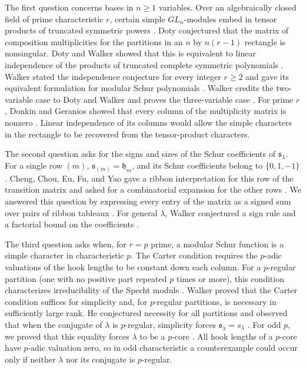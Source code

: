 \documentclass[12pt,reqno,a4paper]{amsart}
\numberwithin{equation}{section}
\numberwithin{figure}{section}
\theoremstyle{plain}
\theoremstyle{definition}
\begin{document}
The first question concerns bases in $n\geq1$ variables.  Over an
algebraically closed field of prime characteristic $r$, certain
simple $GL_n$-modules embed in tensor products of truncated symmetric
powers \cite[Section~1]{DotyWalkerTruncated}.  Doty conjectured that the
matrix of composition multiplicities for the partitions in an
$n$ by $n(r-1)$ rectangle is nonsingular.  Doty and Walker showed that
this is equivalent to linear independence of the products of truncated
complete symmetric polynomials \cite[Conjecture~2.6 and Proposition~3.1]{DotyWalker}.
Walker stated the independence conjecture for every integer $r\geq2$
and gave its equivalent formulation for modular Schur polynomials
\cite[Conjecture~1.4 and Proposition~1.5(i)]{Walker}.
Walker credits the two-variable case to Doty and Walker and proves
the three-variable case
\cite[p.~576 and Proposition~2.17]{Walker}.
For prime $r$, Donkin and Geranios showed that every column of the
multiplicity matrix is nonzero \cite[Corollary~6.8, p.~432]{DonkinGeranios}.
Linear independence of its columns would allow the simple characters
in the rectangle to be recovered from the tensor-product characters.

The second question asks for the signs and sizes of the Schur
coefficients of $\mathfrak s_\lambda$.  For a single row $(m)$,
$\mathfrak s_{(m)}=\mathfrak h_m$, and its Schur coefficients belong
to $\{0,1,-1\}$ \cite{FuMei,Grinberg}.  Cheng, Chou, Eu, Fu, and Yao
gave a ribbon interpretation for this row of the transition matrix
and asked for a combinatorial expansion for the other rows
\cite[Theorem~1.3 and Section~4]{ChengEtAl}.  We answered this
question by expressing every entry of the matrix as a signed sum over
pairs of ribbon tableaux \cite[Theorem~8.8]{JingLiuSkewMN}.
For general $\lambda$,
Walker conjectured a sign rule and a factorial bound on the
coefficients \cite[unnumbered conjecture following Corollary~2.10, p.~586]{Walker}.

The third question asks when, for $r=p$ prime, a modular Schur
function is a simple character in characteristic $p$.  The Carter condition
requires the $p$-adic valuations of the hook lengths to be constant
down each column.  For a $p$-regular partition (one with no positive
part repeated $p$ times or more), this condition characterizes
irreducibility of the Specht module \cite{JamesCarter,JamesMurphy}.
Walker proved that the Carter condition suffices for simplicity and,
for $p$-regular partitions, is necessary in sufficiently large rank.
He conjectured necessity for all partitions and observed that when the
conjugate of $\lambda$ is $p$-regular, simplicity forces
$\mathfrak s_\lambda=s_\lambda$
\cite[Theorem~4.4 and the discussion of Conjectures~4.6--4.7]{Walker}.
For odd $p$, we proved that this equality forces $\lambda$ to be a
$p$-core \cite[Theorem~8.11]{JingLiuSkewMN}.  All hook lengths of a
$p$-core have $p$-adic valuation zero, so in odd characteristic a
counterexample could occur only if neither $\lambda$ nor its conjugate
is $p$-regular.
\end{document}

